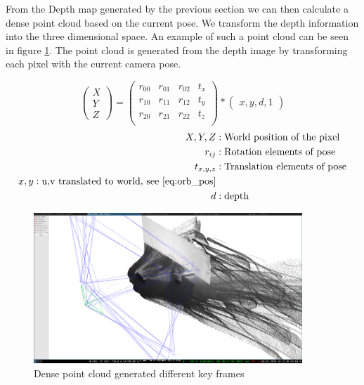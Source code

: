 \documentclass[11pt,a4paper,titlepage,oneside]{report}
\begin{document}
From the Depth map generated by the previous section we can then calculate a dense point cloud based on the current pose. We transform the depth information into the three dimensional space. An example of such a point cloud can be seen in figure \ref{fig:pointcloud}. The point cloud is generated from the depth image by transforming each pixel with the current camera pose.

\begin{equation}\label{eq:point_cloud_depth}
	\begin{pmatrix}
			X \\
			Y \\
			Z
	\end{pmatrix}=
	\begin{pmatrix}
		r_{00} & r_{01} & r_{02} & t_x \\
		r_{10} & r_{11} & r_{12} & t_y \\
		r_{20} & r_{21} & r_{22} & t_z \\
	\end{pmatrix}*
	\begin{pmatrix}
		x,
		y,
		d,
		1
	\end{pmatrix}
\end{equation}
\begin{align*}
	X,Y,Z &:			\text{World position of the pixel}\\
	r_{ij} &:			\text{Rotation elements of pose}\\
	t_{x,y,z} &:	\text{Translation elements of pose}\\
	x,y:					\text{u,v translated to world, see \ref{eq:orb_pos}}\\
	d &:					\text{depth}
\end{align*}

\begin{figure}[H]
  \begin{center}
		\includegraphics[width=0.9\textwidth]{img/pointcloud.png}
  \end{center}
	\caption{Dense point cloud generated different key frames}\label{fig:pointcloud}
\end{figure}
\end{document}
